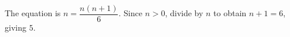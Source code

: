 The equation is $n=\dfrac{n(n+1)}{6}$. Since $n>0$, divide by $n$ to obtain $n+1=6$, giving $\boxed5$.
